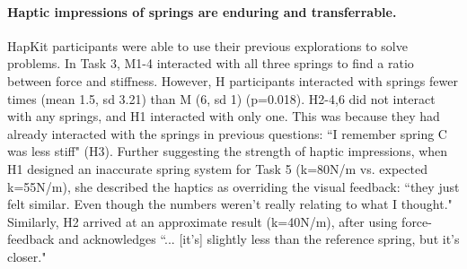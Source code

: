 \paragraph{Haptic impressions of springs are enduring and transferrable.}
HapKit participants were able to use their previous explorations to solve problems.
In Task 3, M1-4 interacted with all three springs to find a ratio between force and stiffness.
However, H participants interacted with springs fewer times (mean 1.5, sd 3.21) than M (6, sd 1) (p=0.018). %
H2-4,6 did not interact with any springs,
and H1 interacted with only one.
This was because they had already 
interacted with the springs in previous questions: 
``I remember spring C was less stiff" (H3).
 Further suggesting the strength of haptic impressions, %
 when H1 designed an inaccurate spring system for Task 5 (k=80N/m vs. expected k=55N/m), 
 she described the haptics as overriding the visual feedback: %
 ``they just felt similar.
 Even though the numbers weren't really relating to what I thought."
 Similarly, H2 arrived at an approximate result (k=40N/m), after using force-feedback and acknowledges ``... [it's] slightly less than the reference spring, but it's closer."


